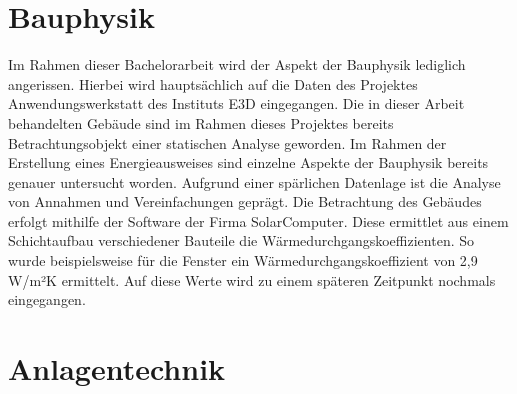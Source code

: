 \section{Bauphysik}
\label{sec:Bauphysik}
Im Rahmen dieser Bachelorarbeit wird der Aspekt der Bauphysik lediglich angerissen. Hierbei wird hauptsächlich auf die Daten des Projektes Anwendungswerkstatt des Instituts E3D eingegangen. Die in dieser Arbeit behandelten Gebäude sind im Rahmen dieses Projektes bereits Betrachtungsobjekt einer statischen Analyse geworden. Im Rahmen der Erstellung eines Energieausweises sind einzelne Aspekte der Bauphysik bereits genauer untersucht worden. Aufgrund einer spärlichen Datenlage ist die Analyse von Annahmen und Vereinfachungen geprägt. Die Betrachtung des Gebäudes erfolgt mithilfe der Software der Firma SolarComputer. Diese ermittlet aus einem Schichtaufbau verschiedener Bauteile die Wärmedurchgangskoeffizienten. So wurde beispielsweise für die Fenster ein Wärmedurchgangskoeffizient von 2,9 W/m²K ermittelt. Auf diese Werte wird zu einem späteren Zeitpunkt nochmals eingegangen. 


\section{Anlagentechnik}
\label{sec:Anlagentechnik}
 
